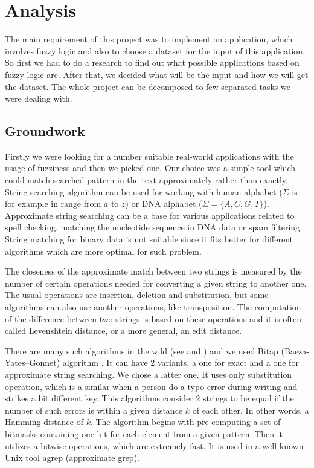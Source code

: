\documentclass[12pt,a4paper,titlepage,final]{article}
\begin{document}
\section{Analysis} \label{analysis}
The main requirement of this project was to implement an application, which involves fuzzy logic and also to choose a dataset for the input of this application. So first we had to do a research to find out what possible applications based on fuzzy logic are. After that, we decided what will be the input and how we will get the dataset. The whole project can be decomposed to few separated tasks we were dealing with.

	\subsection{Groundwork}
	Firstly we were looking for a number suitable real-world applications with the usage of fuzziness and then we picked one. Our choice was a simple tool which could match searched pattern in the text approximately rather than exactly. String searching algorithm can be used for working with human alphabet ($\Sigma$ is for example in range from $a$ to $z$) or DNA alphabet ($\Sigma = \{A,C,G,T\}$). Approximate string searching can be a base for various applications related to spell checking, matching the nucleotide sequence in DNA data or spam filtering. String matching for binary data is not suitable since it fits better for different algorithms which are more optimal for such problem.

	The closeness of the approximate match between two strings is measured by the number of certain operations needed for converting a given string to another one. The usual operations are insertion, deletion and substitution, but some algorithms can also use another operations, like transposition. The computation of the difference between two strings is based on these operations and it is often called Levenshtein distance, or a more general, an edit distance.

	There are many such algorithms in the wild (see \cite{approximate} and \cite{substring}) and we used Bitap (Baeza-Yates–Gonnet) algorithm \cite{bitap2}. It can have 2 variants, a one for exact and a one for approximate string searching. We chose a latter one. It uses only substitution operation, which is a similar when a person do a typo error during writing and strikes a bit different key. This algorithms consider 2 strings to be equal if the number of such errors is within a given distance $k$ of each other. In other words, a Hamming distance of $k$. The algorithm begins with pre-computing a set of bitmasks containing one bit for each element from a given pattern. Then it utilizes a bitwise operations, which are extremely fast. It is used in a well-known Unix tool agrep (approximate grep).
\end{document}
